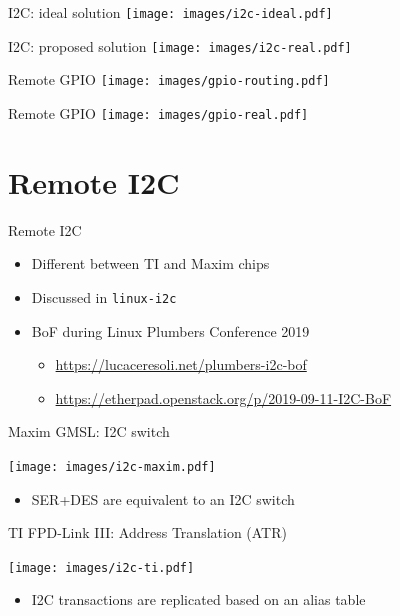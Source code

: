 \documentclass[xetex,table,aspectratio=169]{beamer}
\begin{document}
\begin{frame}{I2C: ideal solution}
  \center\texttt{[image: images/i2c-ideal.pdf]}
\end{frame}

\begin{frame}{I2C: proposed solution}
  \center\texttt{[image: images/i2c-real.pdf]}
\end{frame}

\begin{frame}{Remote GPIO}
  \center\texttt{[image: images/gpio-routing.pdf]}
\end{frame}

\begin{frame}{Remote GPIO}
  \center\texttt{[image: images/gpio-real.pdf]}
\end{frame}


\section{Remote I2C}

\begin{frame}{Remote I2C}
  \begin{itemize}
  \item Different between TI and Maxim chips
  \item Discussed in {\tt linux-i2c}
  \item BoF during Linux Plumbers Conference 2019
    \begin{itemize}
    \item \url{https://lucaceresoli.net/plumbers-i2c-bof}
    \item \url{https://etherpad.openstack.org/p/2019-09-11-I2C-BoF}
    \end{itemize}
  \end{itemize}
\end{frame}

\begin{frame}{Maxim GMSL: I2C switch}
  \begin{center}
    \texttt{[image: images/i2c-maxim.pdf]}
  \end{center}

  \begin{itemize}
  \item SER+DES are equivalent to an I2C switch
  \end{itemize}
\end{frame}

\begin{frame}{TI FPD-Link III: Address Translation (ATR)}
  \begin{center}
    \texttt{[image: images/i2c-ti.pdf]}
  \end{center}

  \begin{itemize}
  \item I2C transactions are replicated based on an alias table
  \end{itemize}
\end{frame}
\end{document}
